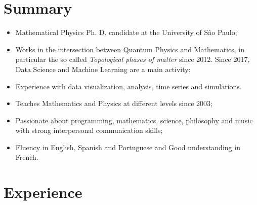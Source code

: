 \documentclass[11pt,a4paper,sans]{moderncv}        %
\begin{document}
\makecvtitle

\section{Summary}

\begin{itemize} 
\item Mathematical Physics Ph. D. candidate at the University of S\~{a}o Paulo;
\item Works in the intersection between Quantum Physics and Mathematics, in particular the so called \emph{Topological phases of matter} since 2012. Since 2017, Data Science and Machine Learning are a main activity;
\item Experience with data visualization, analysis, time series and simulations.
\item Teaches Mathematics and Physics at different levels since 2003; 
\item Passionate about programming, mathematics, science, philosophy and music with strong interpersonal communication skills;
\item Fluency in English, Spanish and Portuguese and Good understanding in French.
\end{itemize} 

\section{Experience}

\vspace{3pt}
\end{document}
